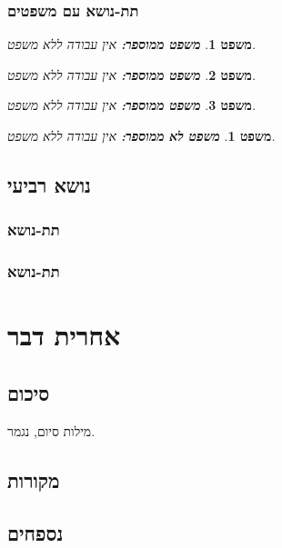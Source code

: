 \documentclass{article}
\newtheorem{theorem.enum}{משפט}
\newtheorem*{theorem}{משפט}
\begin{document}
\subsubsection{תת-נושא עם משפטים}
\begin{theorem.enum}\textbf{משפט ממוספר:}
    אין עבודה ללא משפט.
\end{theorem.enum}
\begin{theorem.enum}\textbf{משפט ממוספר:}
    אין עבודה ללא משפט.
\end{theorem.enum}
\begin{theorem.enum}\textbf{משפט ממוספר:}
    אין עבודה ללא משפט.
\end{theorem.enum}
\begin{theorem}\textbf{משפט לא ממוספר:}
    אין עבודה ללא משפט.
\end{theorem}
\subsection{נושא רביעי}
\subsubsection{תת-נושא}
\subsubsection{תת-נושא}

\newpage
\section{אחרית דבר}
{}
\subsection*{סיכום}
מילות סיום, נגמר.
{}
\subsection*{מקורות}
\begin{otherlanguage}{English}
    \nocite{*}
    \printbibliography[heading=none]
\end{otherlanguage}
{}
\subsection*{נספחים}
\begin{otherlanguage}{English}
    \begin{algorithm}
        \caption{\(0–1\,Test\,for\,Chaos\)}
        {}
    \end{algorithm}
\end{otherlanguage}
\end{document}
